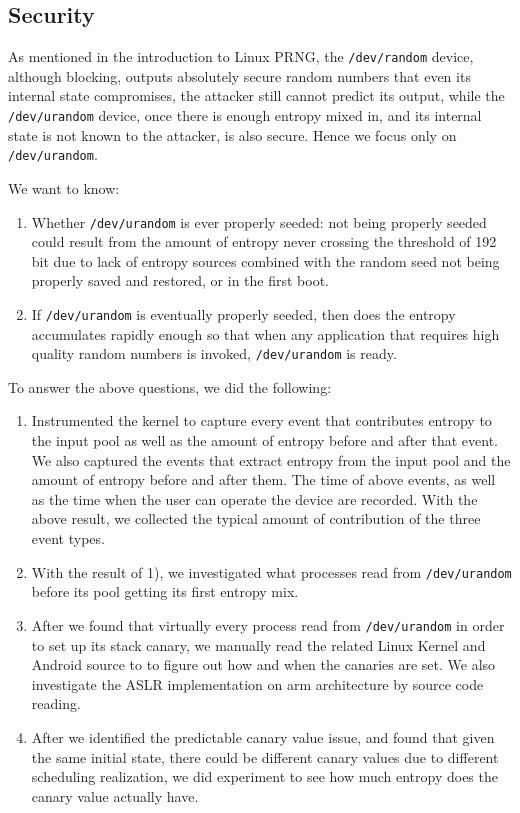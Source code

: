 \subsection{Security}

As mentioned in the introduction to Linux PRNG, the \verb|/dev/random| device, although blocking, outputs absolutely secure random numbers that even its internal state compromises, the attacker still cannot predict its output, while the \verb|/dev/urandom| device, once there is enough entropy mixed in, and its internal state is not known to the attacker, is also secure. Hence we focus only on \verb|/dev/urandom|.

We want to know:

\begin{enumerate}
\item Whether \verb|/dev/urandom| is ever properly seeded: not being properly seeded could result from the amount of entropy never crossing the threshold of 192 bit due to lack of entropy sources combined with the random seed not being properly saved and restored, or in the first boot.

\item If \verb|/dev/urandom| is eventually properly seeded, then does the entropy accumulates rapidly enough so that when any application that requires high quality random numbers is invoked, \verb|/dev/urandom| is ready.

\end{enumerate}

To answer the above questions, we did the following:
\begin{enumerate}
\item Instrumented the kernel to capture every event that contributes entropy to the input pool as well as the amount of entropy before and after that event. We also captured the events that extract entropy from the input pool and the amount of entropy before and after them. The time of above events, as well as the time when the user can operate the device are recorded. With the above result, we collected the typical amount of contribution of the three event types.

\item With the result of 1), we investigated what processes read from \verb|/dev/urandom| before its pool getting its first entropy mix.

\item After we found that virtually every process read from \verb|/dev/urandom| in order to set up its stack canary, we manually read the related Linux Kernel and Android source to to figure out how and when the canaries are set. We also investigate the ASLR implementation on arm architecture by source code reading.

\item After we identified the predictable canary value issue, and found that given the same initial state, there could be different canary values due to different scheduling realization, we did experiment to see how much entropy does the canary value actually have.

\end{enumerate}




